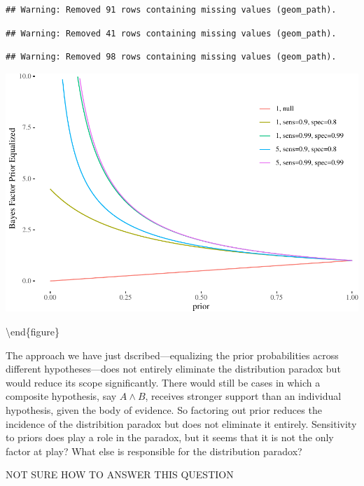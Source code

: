 \documentclass[10pt,dvipsnames,enabledeprecatedfontcommands]{scrartcl}
\begin{document}
\begin{verbatim}
## Warning: Removed 91 rows containing missing values (geom_path).
\end{verbatim}

\begin{verbatim}
## Warning: Removed 41 rows containing missing values (geom_path).
\end{verbatim}

\begin{verbatim}
## Warning: Removed 98 rows containing missing values (geom_path).
\end{verbatim}

\begin{center}\includegraphics[width=0.9\linewidth]{conjunction-paradox_files/figure-latex/unnamed-chunk-17-1} \end{center}

\label{fig:bf-indiv-joint} \textbackslash{}end\{figure\}

The approach we have just dscribed---equalizing the prior probabilities
across different hypotheses---does not entirely eliminate the
distribution paradox but would reduce its scope significantly. There
would still be cases in which a composite hypothesis, say
\(A \wedge B\), receives stronger support than an individual hypothesis,
given the body of evidence. So factoring out prior reduces the incidence
of the distribition paradox but does not eliminate it entirely.
Sensitivity to priors does play a role in the paradox, but it seems that
it is not the only factor at play? What else is responsible for the
distribution paradox?

NOT SURE HOW TO ANSWER THIS QUESTION
\end{document}

